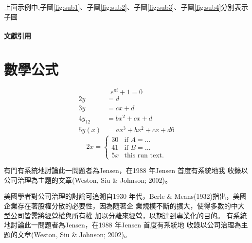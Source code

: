 \documentclass[
    添加扉頁=是,
    添加原創聲明頁=不,
    添加校徽水印=是,
    奇偶頁邊距對稱=不,
    參考文獻頂格=是,
]{.def/must}
\begin{document}
上靣示例中,子圖\ref{fig:sub1}、子圖\ref{fig:sub2}、子圖\ref{fig:sub3}、子圖\ref{fig:sub4}分別表示子圖








\subsubsection{文獻引用}
 \cite{wangzhenwu2004, wenzaowai2009, qiuziheng2017, hedingzhao2019, qiujiongyou2014b, qiujiongyou9999, linjing2018, linwenyao2018, linxhui2014, chenyaning9999, luey2013, wendamao2015, qiujiongyou2014a, abdoh2019, bordwell2013, bourdieu1990, cole1992, harvey2007, johnson2018, macdonald2020, manguel2009b, milliot9999, poff2019, villazón2011, manguel2009a}
 
\chapter{數學公式}
\begin{equation}
\label{eq1}
e^{\pi i}+1=0
\end{equation}
\begin{align}
2 y & =d\label{eq:IntoSection}\\
3 y & =cx+d\\
4 y_{12} & =bx^{2}+cx+d\\
5 y(x) & =ax^{3}+bx^{2}+cx+d
6 
\end{align}
\begin{equation}
2 x=\left\{ \begin{array}{cl}
3 0 & \textrm{if }A=\ldots\\
4 1 & \textrm{if }B=\ldots\\
5 x & \textrm{this run  text.}\end
{array}\right.
\end{equation}       

 
有門有系統地討論此一問題者為Jensen，在1988 年Jensen 首度有系統地我
收錄以公司治理為主題的文章(Weston, Siu \& Johnson; 2002)。

美國學者對公司治理的討論可追溯自1930 年代，Berle \&
Means(1932)指出，美國企業存在著股權分散的必要性，因為隨著企
業規模不斷的擴大，使得多數的中大型公司皆需將經營權與所有權
加以分離來經營，以期達到專業化的目的。
有系統地討論此一問題者為Jensen，在1988 年Jensen 首度有系統地
收錄以公司治理為主題的文章(Weston, Siu \& Johnson; 2002)。
\end{document}
